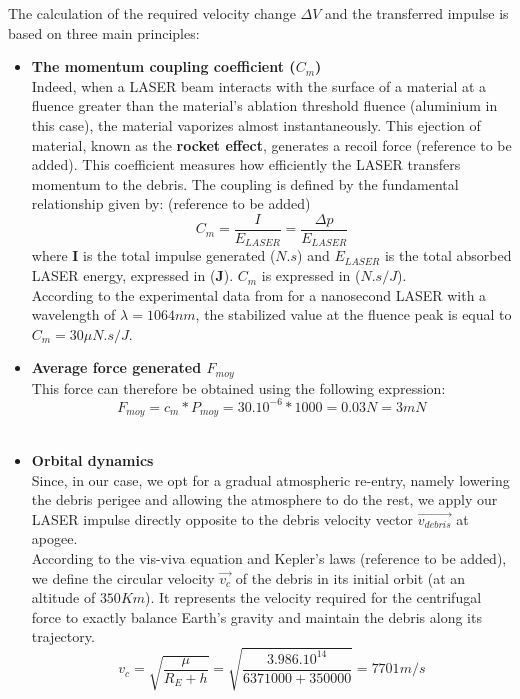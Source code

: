 \documentclass[11pt,a4paper]{article}
\begin{document}
The calculation of the required velocity change $\Delta V$ and the transferred impulse is based on three main principles: \\
\begin{itemize}
    \item \textbf{The momentum coupling coefficient ($C_{m}$)}\\
    Indeed, when a LASER beam interacts with the surface of a material at a fluence greater than the material's ablation threshold fluence (aluminium in this case), the material vaporizes almost instantaneously. This ejection of material, known as the \textbf{rocket effect}, generates a recoil force (reference to be added). This coefficient measures how efficiently the LASER transfers momentum to the debris. The coupling is defined by the fundamental relationship given by: (reference to be added)\\
    \begin{equation}
        \boxed{C_{m} = \frac{I}{E_{LASER}} = \frac{\Delta p}{E_{LASER}}}
    \end{equation}
    where \textbf{I} is the total impulse generated (\textbf{$N.s$}) and \textbf{$E_{LASER}$} is the total absorbed LASER energy, expressed in (\textbf{J}). $C_{m}$ is expressed in (\textbf{$N.s/J$}).\\
    According to the experimental data from \cite{Phipps2012} for a nanosecond LASER with a wavelength of $\lambda = 1064nm$, the stabilized value at the fluence peak is equal to $C_{m} = 30 \mu N.s/J$.\\

    \item \textbf{Average force generated $F_{moy}$}\\
    This force can therefore be obtained using the following expression:
    \begin{equation}
       \boxed{ F_{moy} = c_{m} * P_{moy} = 30.10^{-6} * 1000 = 0.03N = 3 mN}
    \end{equation}\\

    \item \textbf{Orbital dynamics}\\
    Since, in our case, we opt for a gradual atmospheric re-entry, namely lowering the debris perigee and allowing the atmosphere to do the rest, we apply our LASER impulse directly opposite to the debris velocity vector \textbf{$\vec{v_{debris}}$} at apogee.\\
    According to the vis-viva equation and Kepler's laws (reference to be added), we define the circular velocity \textbf{$\vec{{v_{c}}}$} of the debris in its initial orbit (at an altitude of \textbf{$350 Km$}). It represents the velocity required for the centrifugal force to exactly balance Earth's gravity and maintain the debris along its trajectory.
    \begin{equation}
       \boxed{ {v_{c}} = \sqrt{\frac{\mu}{R_{E} + h}} = \sqrt{\frac{3.986.10^{14}}{6371000 + 350000}} = 7701 m/s }
    \end{equation}


\end{itemize}
\end{document}
